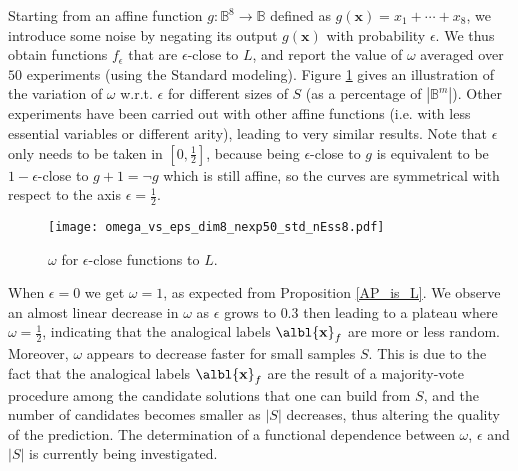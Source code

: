 \documentclass[article]{amsart}
\begin{document}

Starting from an affine function $g \colon \mathbb{B}^8 \to \mathbb{B}$ defined
as  $g(\mathbf{x}) = x_1 + \cdots + x_8$, we introduce some noise by negating
its output $g(\mathbf{x})$ with probability $\epsilon$. We thus obtain
functions $f_{\epsilon}$ that are $\epsilon$-close to $L$, and report the value
of $\omega$ averaged over $50$ experiments (using the Standard modeling).
Figure \ref{omega_vs_eps} gives an illustration of the variation of $\omega$
w.r.t.  $\epsilon$ for different sizes of $S$ (as a percentage of
$|\mathbb{B}^m|$).  Other experiments have been carried out with other affine
functions (i.e.  with less essential variables or different arity), leading to
very similar results.  Note that $\epsilon$ only needs to be taken in $[0,
\frac{1}{2}]$, because being $\epsilon$-close to $g$ is equivalent to be $1 -
\epsilon$-close to $g + 1 = \neg g$ which is still affine, so the curves are
symmetrical with respect to the axis $\epsilon = \frac{1}{2}$.

\begin{figure}
\begin{center}
\texttt{[image: omega\_vs\_eps\_dim8\_nexp50\_std\_nEss8.pdf]}
  \caption{$\omega$ for $\epsilon$-close functions to $L$.}
\label{omega_vs_eps}
\end{center}
\end{figure}

When $\epsilon = 0$ we get $\omega = 1$, as expected from
Proposition \ref{AP_is_L}. We observe an almost linear decrease in $\omega$ as
$\epsilon$ grows to $0.3$ then leading to a plateau where $\omega =
\frac{1}{2}$, indicating that the analogical labels $\albl{\mathbf{x}}_f$ are
more or less random. Moreover, $\omega$ appears to decrease faster for small
samples $S$. This is due to the fact that the analogical labels
$\albl{\mathbf{x}}_f$ are the result of a majority-vote procedure among the
candidate solutions that one can build from $S$, and the number of candidates
becomes smaller as $|S|$ decreases, thus altering the quality of the
prediction. The determination of a functional dependence between $\omega$,
$\epsilon$ and $|S|$ is currently being investigated.
\end{document}
